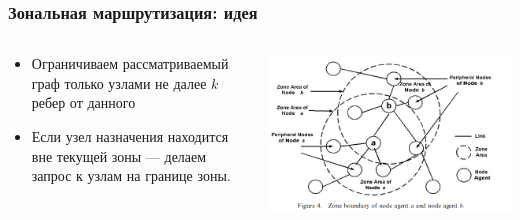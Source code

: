 \documentclass{beamer}
\begin{document}
\begin{frame}
  \frametitle{Зональная маршрутизация: идея}
  \begin{columns}
    \begin{column}{0.6\textwidth}
      \begin{itemize}
      \item Ограничиваем рассматриваемый граф только узлами не далее $k$ ребер от
        данного 
      \item Если узел назначения находится вне текущей зоны --- делаем запрос к
        узлам на границе зоны.
      \end{itemize}
    \end{column}
    \begin{column}{0.4\textwidth}
      \begin{center}
        \includegraphics[width=\textwidth]{zone-routing}
      \end{center}
    \end{column}
  \end{columns}
\end{frame}


\end{document}
